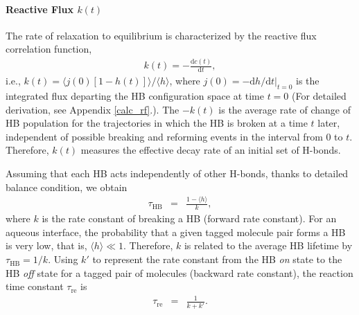 \paragraph{Reactive Flux $k(t)$} 
The rate of relaxation to equilibrium is characterized by the reactive flux correlation function, 
\begin{eqnarray}
k(t) = -\frac{\text{d}c(t)}{\text{d}t},
\label{eq:k}
\end{eqnarray}
i.e., $k(t)=\langle j(0)[1-h(t)]\rangle/\langle h\rangle$\cite{AL96,AL00},
where 
$j(0)=-\text{d}h/\text{d}t|_{t=0}$ 
is the integrated flux departing the HB configuration space at time $t=0$ (For detailed derivation, see Appendix \ref{calc_rf}.).
The $-k(t)$ is the average rate of change of HB population for the trajectories in which the HB is broken at a time $t$ later\cite{AL96}, 
independent of possible breaking and reforming events in the interval from 0 to $t$.
Therefore, $k(t)$ measures the effective decay rate of an initial set of H-bonds\cite{DC87,Starr2000}.


Assuming that each HB acts independently of other H-bonds, 
thanks to detailed balance condition, we obtain 
\begin{eqnarray}
  \tau_{\text{HB}} &=& \frac{1- \langle h\rangle}{k},
\label{eq:rate}
\end{eqnarray}
where $k$ is the rate constant of breaking a HB (forward rate constant)\cite{Chandler1986,Chandler1978}. 
For an aqueous interface, the probability that a given tagged molecule pair forms a HB is very low, that is, $\langle h\rangle \ll 1$. 
Therefore, $k$ is related to the average HB lifetime by $\tau_{\text{HB}}=1/k$.
Using $k'$ to represent the rate constant from the HB \emph{on} state to the HB \emph{off} state for a tagged pair of molecules (backward rate constant),
the reaction time constant $\tau_\text{re}$ is 
\begin{eqnarray}
  \tau_\text{re} &=& \frac{1}{k+k'}.
\label{eq:reaction_rate_tau}
\end{eqnarray}

